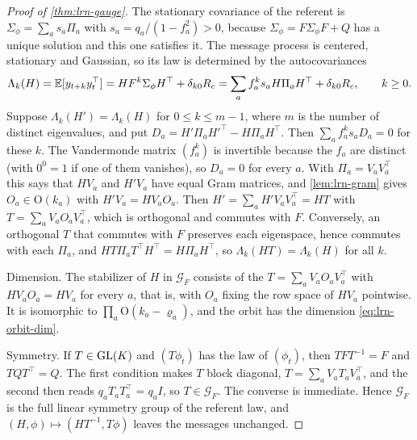 \begin{proof}[Proof of \cref{thm:lrn-gauge}]
The stationary covariance of the referent is $\Sigma_\phi=\sum_as_a\Pi_a$ with $s_a=q_a/(1-f_a^2)>0$, because $\Sigma_\phi=F\Sigma_\phi F+Q$ has a unique solution and this one satisfies it. The message process is centered, stationary and Gaussian, so its law is determined by the autocovariances
\begin{equation}\label{eq:lrn-autocov}
\Lambda_k(H)=\mathbb{E}[y_{t+k}y_t^\top]=HF^k\Sigma_\phi H^\top+\delta_{k0}R_c=\sum_af_a^ks_aH\Pi_aH^\top+\delta_{k0}R_c,\qquad k\ge0.
\end{equation}
Suppose $\Lambda_k(H')=\Lambda_k(H)$ for $0\le k\le m-1$, where $m$ is the number of distinct eigenvalues, and put $D_a=H'\Pi_aH'^\top-H\Pi_aH^\top$. Then $\sum_af_a^ks_aD_a=0$ for these $k$. The Vandermonde matrix $(f_a^k)$ is invertible because the $f_a$ are distinct (with $0^0=1$ if one of them vanishes), so $D_a=0$ for every $a$. With $\Pi_a=V_aV_a^\top$ this says that $HV_a$ and $H'V_a$ have equal Gram matrices, and \cref{lem:lrn-gram} gives $O_a\in\mathrm O(k_a)$ with $H'V_a=HV_aO_a$. Then $H'=\sum_aH'V_aV_a^\top=HT$ with $T=\sum_aV_aO_aV_a^\top$, which is orthogonal and commutes with $F$. Conversely, an orthogonal $T$ that commutes with $F$ preserves each eigenspace, hence commutes with each $\Pi_a$, and $HT\Pi_aT^\top H^\top=H\Pi_aH^\top$, so $\Lambda_k(HT)=\Lambda_k(H)$ for all $k$.

Dimension. The stabilizer of $H$ in $\mathcal G_F$ consists of the $T=\sum_aV_aO_aV_a^\top$ with $HV_aO_a=HV_a$ for every $a$, that is, with $O_a$ fixing the row space of $HV_a$ pointwise. It is isomorphic to $\prod_a\mathrm O(k_a-\varrho_a)$, and the orbit has the dimension \cref{eq:lrn-orbit-dim}.

Symmetry. If $T\in\mathrm{GL}(K)$ and $(T\phi_t)$ has the law of $(\phi_t)$, then $TFT^{-1}=F$ and $TQT^\top=Q$. The first condition makes $T$ block diagonal, $T=\sum_aV_aT_aV_a^\top$, and the second then reads $q_aT_aT_a^\top=q_aI$, so $T\in\mathcal G_F$. The converse is immediate. Hence $\mathcal G_F$ is the full linear symmetry group of the referent law, and $(H,\phi)\mapsto(HT^{-1},T\phi)$ leaves the messages unchanged.
\end{proof}

